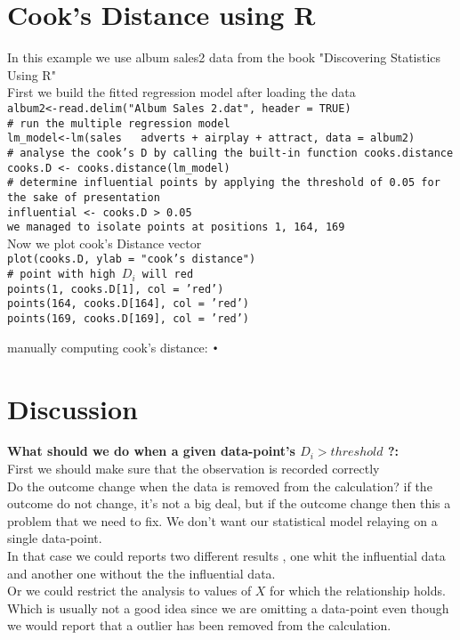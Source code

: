 \documentclass{article}[16pt]
\begin{document}
\section{Cook's Distance using R}
In this example we use album sales2 data from the book "Discovering Statistics Using R" \citep{DSUR}\\
First we build the fitted regression model after loading the data \\
\texttt{album2<-read.delim("Album Sales 2.dat", header = TRUE)\\
\# run the multiple regression model\\
lm\_model<-lm(sales ~ adverts + airplay + attract, data = album2)\\
\# analyse the cook's D by calling the built-in function cooks.distance\\
cooks.D <- cooks.distance(lm\_model)\\
\# determine influential points by applying the threshold of 0.05 for the sake of presentation\\
influential <- cooks.D > 0.05\\
we managed to isolate points at positions 1, 164, 169}\\
Now we plot cook's Distance vector\\
\texttt{plot(cooks.D, ylab = "cook's distance")\\
\# point with high $D_i$ will red\\ 
points(1, cooks.D[1], col = 'red') \\
points(164, cooks.D[164], col = 'red')\\
points(169, cooks.D[169], col = 'red')}


manually computing cook's distance: \texttt{•}
\section{Discussion}
{ \bf What should we do when a given data-point's $D_i > threshold$ ?:}\\


First we should make sure that the observation is recorded correctly\\
Do the outcome change when the data is removed from the calculation? if the outcome do not change, it's not a big deal, but if the outcome change then this a problem that we need to fix. We don't want our statistical model relaying on a single data-point.\\

In that case we could reports two different results , one whit the influential data and another one without the the influential data.\\

Or we could restrict the analysis to values of $X$ for which the relationship holds. Which is usually not a good idea since we are omitting a data-point even though we would report that a outlier has been removed from the calculation. 



\bigskip




\end{document}
